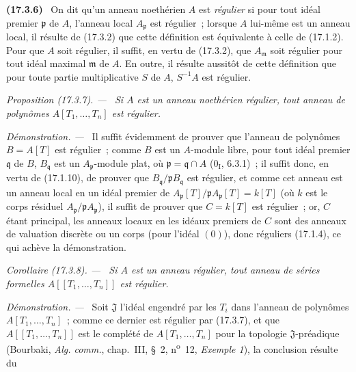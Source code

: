 \documentclass[10pt,oneside]{book}
\makeatletter
\newcommand{\setmanualcurrentlabel}[1]{\def\@currentlabel{#1}}
\newenvironment{env}[1][]{\setmanualcurrentlabel{#1}\par\medskip\noindent\textbf{(#1)}\ }{\par}
\newenvironment{proposition}[1][]{%
  \setmanualcurrentlabel{#1}\par\medskip\noindent\itshape Proposition (#1). ---\ }{\par}
\newenvironment{corollary}[1][]{%
  \setmanualcurrentlabel{#1}\par\medskip\noindent\itshape Corollaire (#1). ---\ }{\par}
\newenvironment{proof}{%
  \par\medskip\noindent\textit{Démonstration. ---\ }}{\par}
\makeatother
\begin{document}
\begin{env}[17.3.6]
\label{0.17.3.6-fr}
On dit qu'un anneau noethérien $A$ est \emph{régulier} si pour tout idéal
premier $\mathfrak{p}$ de $A$, l'anneau local $A_{\mathfrak{p}}$ est
régulier~; lorsque $A$ lui-même est un anneau local, il résulte de (17.3.2)
que cette définition est équivalente à celle de (17.1.2). Pour que $A$ soit
régulier, il suffit, en vertu de (17.3.2), que $A_{\mathfrak{m}}$ soit
régulier pour tout idéal maximal $\mathfrak{m}$ de $A$. En outre, il résulte
aussitôt de cette définition que pour toute partie multiplicative $S$ de
$A$, $S^{-1}A$ est régulier.
\end{env}

\begin{proposition}[17.3.7]
\label{0.17.3.7-fr}
Si $A$ est un anneau noethérien régulier, tout anneau de polynômes
$A[T_1,\ldots,T_n]$ est régulier.
\end{proposition}

\begin{proof}
Il suffit évidemment de prouver que l'anneau de polynômes $B=A[T]$ est
régulier~; comme $B$ est un $A$-module libre, pour tout idéal premier
$\mathfrak{q}$ de $B$, $B_{\mathfrak{q}}$ est un
$A_{\mathfrak{p}}$-module plat, où $\mathfrak{p}=\mathfrak{q}\cap A$
($0_{\mathrm I}$, 6.3.1)~; il suffit donc, en vertu de (17.1.10), de prouver
que $B_{\mathfrak{q}}/\mathfrak{p}B_{\mathfrak{q}}$ est régulier, et comme
cet anneau est un anneau local en un idéal premier de
$A_{\mathfrak{p}}[T]/\mathfrak{p}A_{\mathfrak{p}}[T]=k[T]$ (où $k$ est le
corps résiduel $A_{\mathfrak{p}}/\mathfrak{p}A_{\mathfrak{p}}$), il suffit
de prouver que $C=k[T]$ est régulier~; or, $C$ étant principal, les anneaux
locaux en les idéaux premiers de $C$ sont des anneaux de valuation discrète
ou un corps (pour l'idéal $(0)$), donc réguliers (17.1.4), ce qui achève la
démonstration.
\end{proof}

\begin{corollary}[17.3.8]
\label{0.17.3.8-fr}
Si $A$ est un anneau régulier, tout anneau de séries formelles
$A[[T_1,\ldots,T_n]]$ est régulier.
\end{corollary}

\begin{proof}
Soit $\mathfrak{J}$ l'idéal engendré par les $T_i$ dans l'anneau de polynômes
$A[T_1,\ldots,T_n]$~; comme ce dernier est régulier par (17.3.7), et que
$A[[T_1,\ldots,T_n]]$ est le complété de $A[T_1,\ldots,T_n]$ pour la
topologie $\mathfrak{J}$-préadique (Bourbaki, \emph{Alg. comm.}, chap.~III,
\S~2, n\textsuperscript{o}~12, \emph{Exemple 1}), la conclusion résulte du
\end{proof}
\end{document}
